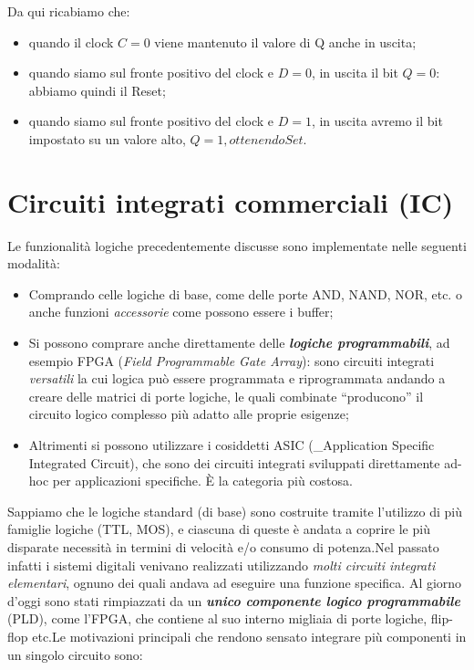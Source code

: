 \documentclass[
]{book}
\providecommand{\tightlist}{%
  \setlength{\itemsep}{0pt}\setlength{\parskip}{0pt}}
\begin{document}
Da qui ricabiamo che:

\begin{itemize}
\tightlist
\item
  quando il clock \(C=0\) viene mantenuto il valore di Q anche in
  uscita;
\item
  quando siamo sul fronte positivo del clock e \(D=0\), in uscita il bit
  \(Q=0\): abbiamo quindi il Reset;
\item
  quando siamo sul fronte positivo del clock e \(D=1\), in uscita avremo
  il bit impostato su un valore alto, \(Q=1, ottenendo Set.\)
\end{itemize}

\chapter{Circuiti integrati commerciali
(IC)}\label{circuiti-integrati-commerciali-ic}

Le funzionalità logiche precedentemente discusse sono implementate nelle
seguenti modalità:

\begin{itemize}
\tightlist
\item
  Comprando celle logiche di base, come delle porte AND, NAND, NOR, etc.
  o anche funzioni \emph{accessorie} come possono essere i buffer;
\item
  Si possono comprare anche direttamente delle \textbf{\emph{logiche
  programmabili}}, ad esempio FPGA (\emph{Field Programmable Gate
  Array}): sono circuiti integrati \emph{versatili} la cui logica può
  essere programmata e riprogrammata andando a creare delle matrici di
  porte logiche, le quali combinate ``producono'' il circuito logico
  complesso più adatto alle proprie esigenze;
\item
  Altrimenti si possono utilizzare i cosiddetti ASIC (\_Application
  Specific Integrated Circuit), che sono dei circuiti integrati
  sviluppati direttamente ad-hoc per applicazioni specifiche. È la
  categoria più costosa.
\end{itemize}

Sappiamo che le logiche standard (di base) sono costruite tramite
l'utilizzo di più famiglie logiche (TTL, MOS), e ciascuna di queste è
andata a coprire le più disparate necessità in termini di velocità e/o
consumo di potenza.\newline Nel passato infatti i sistemi digitali
venivano realizzati utilizzando \emph{molti circuiti integrati
elementari}, ognuno dei quali andava ad eseguire una funzione specifica.
Al giorno d'oggi sono stati rimpiazzati da un \textbf{\emph{unico
componente logico programmabile}} (PLD), come l'FPGA, che contiene al
suo interno migliaia di porte logiche, flip-flop etc.\newline Le
motivazioni principali che rendono sensato integrare più componenti in
un singolo circuito sono:
\end{document}
